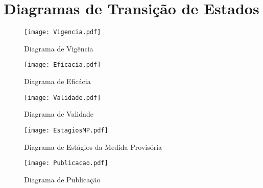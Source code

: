 \chapter{Diagramas de Transição de Estados}
\label{apendice_diagramas}


\begin{figure}[htb]
	\caption{\label{fig_grafico_vigencia}Diagrama de Vigência}
	\begin{center}
	    \texttt{[image: Vigencia.pdf]}
	\end{center}
\end{figure}

\begin{figure}[htb]
	\caption{\label{fig_grafico_eficacia}Diagrama de Eficácia}
	\begin{center}
	    \texttt{[image: Eficacia.pdf]}
	\end{center}
\end{figure}

\begin{figure}[htb]
	\caption{\label{fig_grafico_validade}Diagrama de Validade}
	\begin{center}
	    \texttt{[image: Validade.pdf]}
	\end{center}
\end{figure}

\begin{figure}[htb]
	\caption{\label{fig_grafico_estagios-mp}Diagrama de Estágios da Medida
	Provisória}
	\begin{center}
	    \texttt{[image: EstagiosMP.pdf]}
	\end{center}
\end{figure}

\begin{figure}[htb]
	\caption{\label{fig_grafico_publicacao}Diagrama de Publicação}
	\begin{center}
	    \texttt{[image: Publicacao.pdf]}
	\end{center}
\end{figure}
